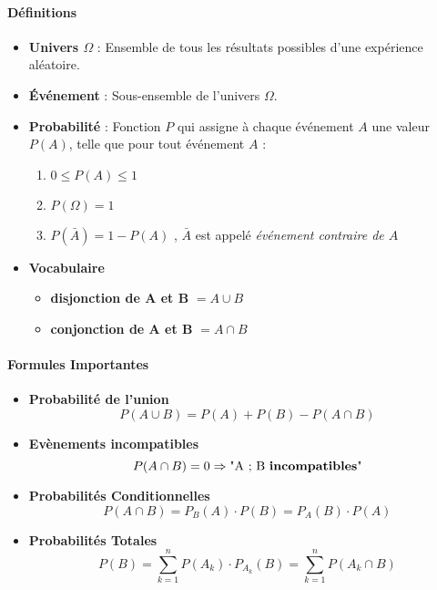 \documentclass{report}
\begin{document}
    \paragraph{Définitions}

    \begin{itemize}
        \item \textbf{Univers $\Omega$} : Ensemble de tous les résultats possibles d'une expérience aléatoire.
        \item \textbf{Événement} : Sous-ensemble de l'univers $\Omega$.
        \item \textbf{Probabilité} : Fonction $P$ qui assigne à chaque événement $A$ une valeur $P(A)$, telle que pour tout événement $A$ :
        \begin{enumerate}
            \item $0 \leq P(A) \leq 1$
            \item $P(\Omega) = 1$
            \item $P(\bar{A}) = 1 - P(A)$ , $\bar{A}$ est appelé \textit{événement contraire de $A$}
        \end{enumerate}
        \item \textbf{Vocabulaire}
        \begin{itemize}
          \item \textbf{disjonction de A et B} $= A \cup B$
          \item \textbf{conjonction de A et B} $= A \cap B$
        \end{itemize}
    \end{itemize}

    \paragraph{Formules Importantes}

    \begin{itemize}
        \item \textbf{Probabilité de l'union}
        \[P(A \cup B) = P(A) + P(B) - P(A \cap B)\]
        \item \textbf{Evènements incompatibles}
        \[P(A \cap B) = 0 \Rightarrow \text{"A ; B \textbf{incompatibles}"}\]
        \item \textbf{Probabilités Conditionnelles}
        \[P(A \cap B) = P_B(A) \cdot P(B) = P_A(B) \cdot P(A)\]
        \item \textbf{Probabilités Totales}
        \[P(B) = \sum_{k=1}^{n} P(A_k) \cdot P_{A_k}(B) = \sum_{k=1}^{n}P(A_k \cap B)\]
        
    \end{itemize}
\end{document}
